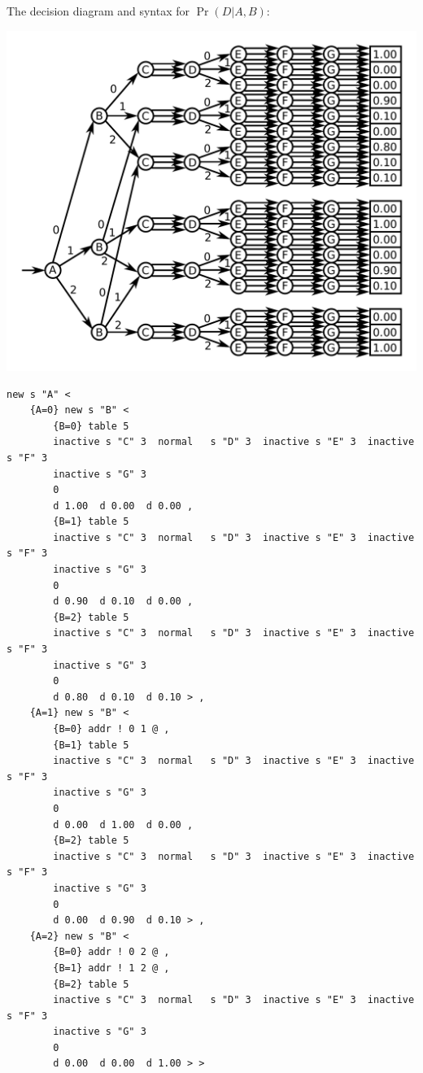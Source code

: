 \documentclass{article}
\begin{document}
\begin{minipage}{\textwidth}
The decision diagram and syntax for \(\Pr(D|A,B)\):

\includegraphics[width = \textwidth]{Pr(D)}
\end{minipage}

\begin{verbatim}
new s "A" < 
    {A=0} new s "B" < 
        {B=0} table 5
        inactive s "C" 3  normal   s "D" 3  inactive s "E" 3  inactive s "F" 3
        inactive s "G" 3 
        0 
        d 1.00  d 0.00  d 0.00 , 
        {B=1} table 5
        inactive s "C" 3  normal   s "D" 3  inactive s "E" 3  inactive s "F" 3
        inactive s "G" 3 
        0 
        d 0.90  d 0.10  d 0.00 , 
        {B=2} table 5
        inactive s "C" 3  normal   s "D" 3  inactive s "E" 3  inactive s "F" 3
        inactive s "G" 3 
        0 
        d 0.80  d 0.10  d 0.10 > , 
    {A=1} new s "B" <  
        {B=0} addr ! 0 1 @ , 
        {B=1} table 5
        inactive s "C" 3  normal   s "D" 3  inactive s "E" 3  inactive s "F" 3
        inactive s "G" 3 
        0 
        d 0.00  d 1.00  d 0.00 , 
        {B=2} table 5
        inactive s "C" 3  normal   s "D" 3  inactive s "E" 3  inactive s "F" 3
        inactive s "G" 3 
        0 
        d 0.00  d 0.90  d 0.10 > , 
    {A=2} new s "B" <  
        {B=0} addr ! 0 2 @ , 
        {B=1} addr ! 1 2 @ , 
        {B=2} table 5
        inactive s "C" 3  normal   s "D" 3  inactive s "E" 3  inactive s "F" 3
        inactive s "G" 3 
        0 
        d 0.00  d 0.00  d 1.00 > > 
\end{verbatim}
\end{document}
